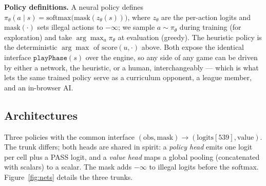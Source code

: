 \documentclass{article}
\begin{document}
\textbf{Policy definitions.} A neural policy defines
$\pi_\theta(a\mid s)=\mathrm{softmax}\big(\text{mask}(z_\theta(s))\big)$, where
$z_\theta$ are the per-action logits and $\text{mask}(\cdot)$ sets illegal actions to
$-\infty$; we sample $a\sim\pi_\theta$ during training (for exploration) and take
$\arg\max_a \pi_\theta$ at evaluation (greedy). The heuristic policy is the
deterministic $\arg\max$ of $\text{score}(u,\cdot)$ above. Both expose the identical
interface $\texttt{playPhase}(s)$ over the engine, so any side of any game can be driven
by either a network, the heuristic, or a human, interchangeably --- which is what lets
the same trained policy serve as a curriculum opponent, a league member, and an
in-browser AI.

\subsection{Architectures}
Three policies with the common interface $(\text{obs}, \text{mask}) \to
(\text{logits}[539], \text{value})$. The trunk differs; both heads are shared in spirit:
a \emph{policy head} emits one logit per cell plus a PASS logit, and a \emph{value head}
maps a global pooling (concatenated with scalars) to a scalar. The mask adds $-\infty$ to
illegal logits before the softmax. Figure~\ref{fig:nets} details the three trunks.
\end{document}
